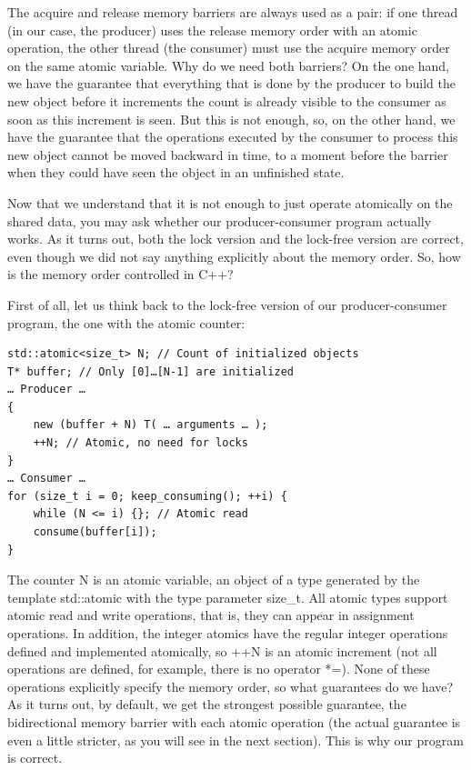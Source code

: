 The acquire and release memory barriers are always used as a pair: if one thread (in our case, the producer) uses the release memory order with an atomic operation, the other thread (the consumer) must use the acquire memory order on the same atomic variable. Why do we need both barriers? On the one hand, we have the guarantee that everything that is done by the producer to build the new object before it increments the count is already visible to the consumer as soon as this increment is seen. But this is not enough, so, on the other hand, we have the guarantee that the operations executed by the consumer to process this new object cannot be moved backward in time, to a moment before the barrier when they could have seen the object in an unfinished state.

Now that we understand that it is not enough to just operate atomically on the shared data, you may ask whether our producer-consumer program actually works. As it turns out, both the lock version and the lock-free version are correct, even though we did not say anything explicitly about the memory order. So, how is the memory order controlled in C++?


First of all, let us think back to the lock-free version of our producer-consumer program, the one with the atomic counter:

\begin{lstlisting}[style=styleCXX]
std::atomic<size_t> N; // Count of initialized objects
T* buffer; // Only [0]…[N-1] are initialized
… Producer …
{
	new (buffer + N) T( … arguments … );
	++N; // Atomic, no need for locks
}
… Consumer …
for (size_t i = 0; keep_consuming(); ++i) {
	while (N <= i) {}; // Atomic read
	consume(buffer[i]);
}
\end{lstlisting}

The counter N is an atomic variable, an object of a type generated by the template std::atomic with the type parameter size\_t. All atomic types support atomic read and write operations, that is, they can appear in assignment operations. In addition, the integer atomics have the regular integer operations defined and implemented atomically, so ++N is an atomic increment (not all operations are defined, for example, there is no operator *=). None of these operations explicitly specify the memory order, so what guarantees do we have? As it turns out, by default, we get the strongest possible guarantee, the bidirectional memory barrier with each atomic operation (the actual guarantee is even a little stricter, as you will see in the next section). This is why our program is correct.

